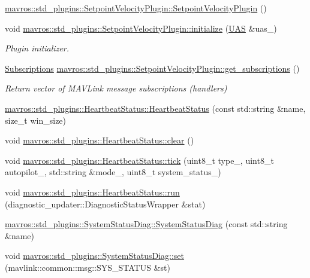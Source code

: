 \begin{DoxyCompactItemize}
\mbox{\hyperlink{group__plugin_ga9baa508ff9d450a25c0a0f46067bc6c0}{mavros\+::std\+\_\+plugins\+::\+Setpoint\+Velocity\+Plugin\+::\+Setpoint\+Velocity\+Plugin}} ()
\item 
void \mbox{\hyperlink{group__plugin_ga0edbf48d95b744f3a8cb1741556541dc}{mavros\+::std\+\_\+plugins\+::\+Setpoint\+Velocity\+Plugin\+::initialize}} (\mbox{\hyperlink{classmavros_1_1UAS}{U\+AS}} \&uas\+\_\+)
\begin{DoxyCompactList}\small\item\em Plugin initializer. \end{DoxyCompactList}\item 
\mbox{\hyperlink{group__plugin_ga8967d61fc77040e0c3ea5a4585d62a09}{Subscriptions}} \mbox{\hyperlink{group__plugin_ga63aa4be791ca2a5877ac7a1a6f4e881e}{mavros\+::std\+\_\+plugins\+::\+Setpoint\+Velocity\+Plugin\+::get\+\_\+subscriptions}} ()
\begin{DoxyCompactList}\small\item\em Return vector of M\+A\+V\+Link message subscriptions (handlers) \end{DoxyCompactList}\item 
\mbox{\hyperlink{group__plugin_ga0039e2c63a99948b0ddc34d9a543d707}{mavros\+::std\+\_\+plugins\+::\+Heartbeat\+Status\+::\+Heartbeat\+Status}} (const std\+::string \&name, size\+\_\+t win\+\_\+size)
\item 
void \mbox{\hyperlink{group__plugin_gab6cb3f1f2eb5cf77a1efb3b9b82c0a4b}{mavros\+::std\+\_\+plugins\+::\+Heartbeat\+Status\+::clear}} ()
\item 
void \mbox{\hyperlink{group__plugin_ga3b9373356e08654bd08a28325ed4f24a}{mavros\+::std\+\_\+plugins\+::\+Heartbeat\+Status\+::tick}} (uint8\+\_\+t type\+\_\+, uint8\+\_\+t autopilot\+\_\+, std\+::string \&mode\+\_\+, uint8\+\_\+t system\+\_\+status\+\_\+)
\item 
void \mbox{\hyperlink{group__plugin_gaf1e9db0d3abf74c3025084c4a4dbae8a}{mavros\+::std\+\_\+plugins\+::\+Heartbeat\+Status\+::run}} (diagnostic\+\_\+updater\+::\+Diagnostic\+Status\+Wrapper \&stat)
\item 
\mbox{\hyperlink{group__plugin_ga8a20cabc2080762291d761bb2cbcdc67}{mavros\+::std\+\_\+plugins\+::\+System\+Status\+Diag\+::\+System\+Status\+Diag}} (const std\+::string \&name)
\item 
void \mbox{\hyperlink{group__plugin_gaaa81bef57bcfc548116f3c98d9fdd168}{mavros\+::std\+\_\+plugins\+::\+System\+Status\+Diag\+::set}} (mavlink\+::common\+::msg\+::\+S\+Y\+S\+\_\+\+S\+T\+A\+T\+US \&st)
\item 

\end{DoxyCompactItemize}

